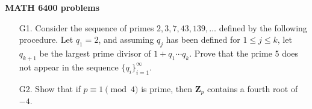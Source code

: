\documentclass[12pt]{article}
\def\Z{\mathbf{Z}}
\begin{document}
\vskip 10pt \noindent\textbf{MATH 6400 problems}
\begin{enumerate}
\item[G1.]Consider the sequence of primes $2, 3, 7, 43, 139, \dots$ defined by the following procedure. Let $q_1 = 2$, and assuming $q_j$ has been defined for $1\le j\le k$, let $q_{k+1}$ be the largest
prime divisor of $1 + q_1 \cdots q_k$.  Prove
that the prime 5 does not appear in the sequence $\{q_i\}_{i=1}^{\infty}$.

\item[G2.] Show that if $p\equiv 1\pmod{4}$ is prime, then $\Z_p$ contains a fourth root of $-4$.
\end{enumerate}
\end{document}
